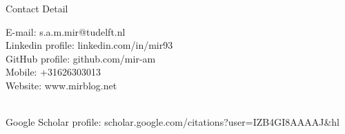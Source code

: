 \documentclass{resume} %
\begin{document}


\begin{rSection}{Contact Detail}

\begin{multicols}{2}
E-mail: s.a.m.mir@tudelft.nl \\
Linkedin profile: linkedin.com/in/mir93 \\
GitHub profile: github.com/mir-am \\
\vfill\null
\columnbreak
Mobile: +31626303013\\
Website: www.mirblog.net\\
\end{multicols}
~\\[-1.5cm]
Google Scholar profile: scholar.google.com/citations?user=IZB4GI8AAAAJ\&hl
	
	

	



	
\end{rSection}

\end{document}
